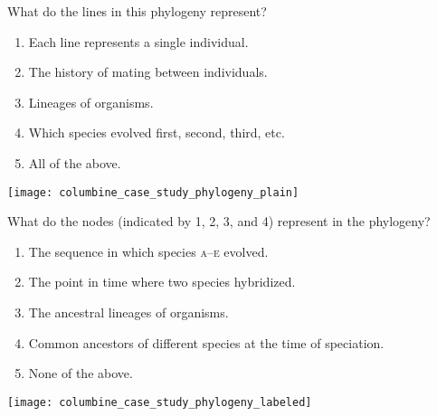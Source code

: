 \documentclass[t,hidelinks]{beamer}
\newcommand{\ques}[1]{\highlight{\textsc{q#1:}}}
\begin{document}
%
\begin{frame}[t]{\ques2 What do the lines in this phylogeny represent?}

	\begin{multicols}{2}
	\begin{enumerate}

		\item Each line represents a single individual.

		\item The history of mating between individuals.

		\item \alert<2>{Lineages of organisms.}

		\item Which species evolved first, second, third, etc.

		\item All of the above. 

	\end{enumerate}

	\columnbreak
	
	\hfill \texttt{[image: columbine\_case\_study\_phylogeny\_plain]}
	\end{multicols}
\end{frame}
%
\begin{frame}[t]{\ques3 What do the nodes (indicated by 1, 2, 3, and 4) represent in the phylogeny?}

	\begin{multicols}{2}
	\begin{enumerate}

		\item The sequence in which species \textsc{a}–\textsc{e} evolved.
		
		\item The point in time where two species hybridized.
		
		\item The ancestral lineages of organisms.
		
		\item \alert<2>{Common ancestors of different species at the time of speciation.}
		
		\item None of the above.

	\end{enumerate}

	\columnbreak
	
	\hfill \texttt{[image: columbine\_case\_study\_phylogeny\_labeled]}
		
	\end{multicols}
\end{frame}
\end{document}
